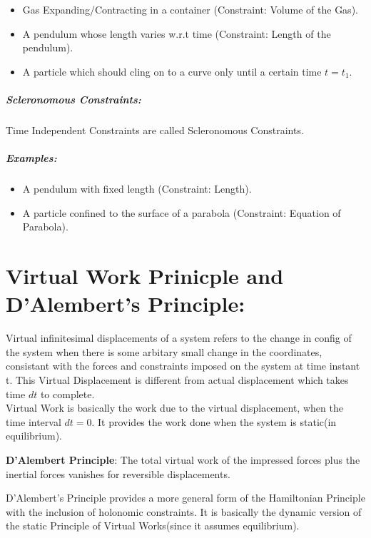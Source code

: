 \documentclass[a4paper]{article}
\begin{document}
			\begin{itemize}
				\item Gas Expanding/Contracting in a container (Constraint: Volume of the Gas).
				\item A pendulum whose length varies w.r.t time (Constraint: Length of the pendulum).
				\item A particle which should cling on to a curve only until a certain time $t=t_1$.
			\end{itemize}

		\subparagraph*{Scleronomous Constraints: }
			Time Independent Constraints are called Scleronomous Constraints.

			\subparagraph*{Examples: }

			\begin{itemize}
				\item A pendulum with fixed length (Constraint: Length).
				\item A particle confined to the surface of a parabola (Constraint: Equation of Parabola).
			\end{itemize}

	\section*{Virtual Work Prinicple and D'Alembert's Principle: }

		\noindent
		
		Virtual infinitesimal displacements of a system refers to the change in config of the system when there is some arbitary small change in the coordinates, consistant with the forces and constraints imposed on the system at time instant t. This Virtual Displacement is different from actual displacement which takes time $dt$ to complete. \\

		Virtual Work is basically the work due to the virtual displacement, when the time interval $dt=0$. It provides the work done when the system is static(in equilibrium).

		\textbf{D'Alembert Principle}: The total virtual work of the impressed forces plus the inertial forces vanishes for reversible displacements.

		D'Alembert's Principle provides a more general form of the Hamiltonian Principle with the inclusion of holonomic constraints. It is basically the dynamic version of the static Principle of Virtual Works(since it assumes equilibrium).
\end{document}
